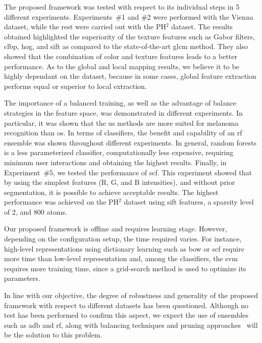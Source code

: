 The proposed framework was tested with respect to its individual steps in 5 different experiments.
Experiments~\#1 and \#2 were performed with the Vienna dataset, while the rest were carried out with the PH$^{2}$ dataset.
The results obtained highlighted the superiority of the texture features such as Gabor filters, \ac{clbp}, \ac{hog}, and \ac{sift} as compared to the state-of-the-art \ac{glcm} method.
They also showed that the combination of color and texture features leads to a better performance.
As to the global and local mapping results, we believe it to be highly dependant on the dataset, because in some cases, global feature extraction performs equal or superior to local extraction.

The importance of a balanced training, as well as the advantage of balance strategies in the feature space, was demonstrated in different experiments.
In particular, it was shown that the \ac{us} methods are more suited for melanoma recognition than \ac{os}.
In terms of classifiers, the benefit and capability of an \ac{rf} ensemble was shown throughout different experiments.
In general, random forests is a less parameterized classifier, computationally less expensive, requiring minimum user interactions and obtaining the highest results. 
Finally, in Experiment~\#5, we tested the performance of \acl{scf}.
This experiment showed that by using the simplest features (R, G, and B intensities), and without prior segmentation, it is possible to achieve acceptable results.
The highest performance was achieved on the PH$^{2}$ dataset using \ac{sift} features, a sparsity level of 2, and 800 atoms.


Our proposed framework is offline and requires learning stage.
However, depending on the configuration setup, the time required varies.
For instance, high-level representations using dictionary learning such as \ac{bow} or \ac{scf} require more time than low-level representation and, among the classifiers, the \ac{svm} requires more training time, since a grid-search method is used to optimize its parameters.

In line with our objective, the degree of robustness and generality of the proposed framework with respect to different datasets has been questioned.
Although no test has been performed to confirm this aspect, we expect the use of ensembles such as \ac{adb} and \ac{rf}, along with balancing techniques and pruning approaches~\cite{rastgoo2012pruning} will be the solution to this problem.
